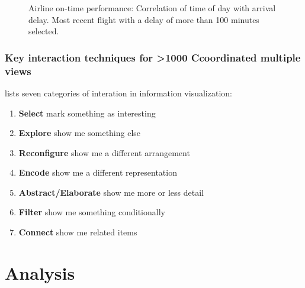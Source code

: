 \documentclass{article}
\newcommand\hmm[1]{\ifnum\ifhmode\spacefactor\else2000\fi>1000 \uppercase{#1}\else#1\fi}
\newcommand{\cmvs}{\hmm{c}oordinated multiple views}
\begin{document}
\begin{figure}[h]
  \centering
  \caption{Airline on-time performance: Correlation of time of day with arrival delay. Most recent flight with a delay of more than 100 minutes selected.}
  \label{fig:research:cmv}
\end{figure}

\subsubsection{Key interaction techniques for \cmvs{}}

\textcite{Yi2007} lists seven categories of interation in information visualization:
\begin{enumerate}
  \item
    \textbf{Select} mark something as interesting
  \item
    \textbf{Explore} show me something else
  \item
    \textbf{Reconfigure} show me a different arrangement
  \item
    \textbf{Encode} show me a different representation
  \item
    \textbf{Abstract/Elaborate} show me more or less detail
  \item
    \textbf{Filter} show me something conditionally
  \item
    \textbf{Connect} show me related items
\end{enumerate}


\clearpage
\section{Analysis}\label{sec:analysis}

\end{document}
